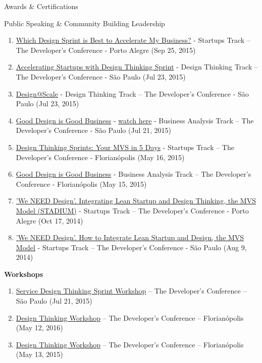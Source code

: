 \documentclass{resume} %
\begin{document}
\begin{rSection}{Awards \& Certifications}
\begin{rSection}{Public Speaking \& Community Building Leadership}
\begin{enumerate}
    \item  \href{https://thedevconf.com/tdc/2015/portoalegre/trilha-startups}{Which Design Sprint is Best to Accelerate My Business?} - Startups Track -- The Developer's Conference - Porto Alegre (Sep 25, 2015)
    \item  \href{https://thedevconf.com/tdc/2015/saopaulo/trilha-design-thinking}{Accelerating Startups with Design Thinking Sprint} - Design Thinking Track -- The Developer's Conference - São Paulo (Jul 23, 2015)
    \item  \href{https://thedevconf.com/tdc/2015/saopaulo/trilha-design-thinking}{Design@Scale} - Design Thinking Track -- The Developer's Conference - São Paulo (Jul 23, 2015)
    \item  \href{https://thedevconf.com/tdc/2015/saopaulo/trilha-analise-de-negocios}{Good Design is Good Business} - \href{https://www.youtube.com/watch?v=9EaTq3uVu8I&list=PLXHrMWvxds3HRIkAzHRwV9AZtRmi7u6jP&index=3&t=7s}{watch here} - Business Analysis Track -- The Developer's Conference - São Paulo (Jul 21, 2015)
    \item  \href{https://thedevconf.com/tdc/2015/florianopolis/trilha-startups}{Design Thinking Sprints: Your MVS in 5 Days} - Startups Track -- The Developer's Conference - Florianópolis (May 16, 2015)
    \item  \href{https://thedevconf.com/tdc/2015/florianopolis/trilha-analise-de-negocios}{Good Design is Good Business} - Business Analysis Track -- The Developer's Conference - Florianópolis (May 15, 2015)
    \item  \href{https://thedevconf.com/tdc/2014/portoalegre/trilha-startups}{'We NEED Design'. Integrating Lean Startup and Design Thinking, the MVS Model (STADIUM)} - Startups Track -- The Developer's Conference - Porto Alegre (Oct 17, 2014)
    \item  \href{https://thedevconf.com/tdc/2014/saopaulo/trilha-startups}{'We NEED Design'. How to Integrate Lean Startup and Design, the MVS Model} - Startups Track -- The Developer's Conference - São Paulo (Aug 9, 2014)\\
\end{enumerate}

\textbf{Workshops}

\begin{enumerate}
    \item  \href{https://thedevconf.com/tdc/2015/saopaulo/workshop-service-design-thinking}{Service Design Thinking Sprint Workshop} -- The Developer's Conference -- São Paulo (Jul 21, 2015)
    \item  \href{https://thedevconf.com/tdc/2016/florianopolis/workshop-design-thinking}{Design Thinking Workshop} -- The Developer's Conference -- Florianópolis (May 12, 2016)
    \item  \href{https://thedevconf.com/tdc/2015/florianopolis/workshop-design-thinking}{Design Thinking Workshop} -- The Developer's Conference -- Florianópolis (May 13, 2015)\\
\end{enumerate}


\end{rSection}
\end{rSection}
\end{document}
